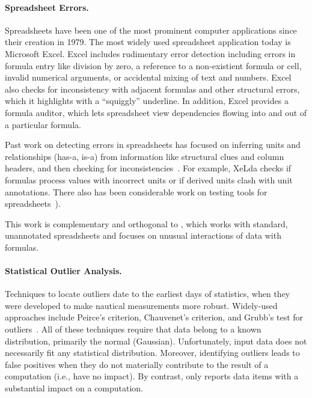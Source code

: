 \paragraph{Spreadsheet Errors.}
Spreadsheets have been one of the most prominent computer applications
since their creation in 1979.
 The most widely used spreadsheet application today is Microsoft
Excel. Excel includes rudimentary error detection including errors in
formula entry like division by zero, a reference to a non-existient
formula or cell, invalid numerical arguments, or accidental mixing of
text and numbers.
Excel also checks for inconsistency with adjacent formulas and other
structural errors, which it highlights with a ``squiggly'' underline. In addition, Excel provides a formula auditor, which lets spreadsheet view dependencies flowing into and out of a particular formula.

Past work on detecting errors in spreadsheets has focused on inferring
units and relationships (has-a, is-a) from information like structural
clues and column
headers, and then checking for inconsistencies~\cite{Antoniu:2004:VUC:998675.999448,DBLP:conf/kbse/AhmadAGK03,Chambers:2010:RSL:1860134.1860346,Erwig:2009:SES:1608570.1608694,Erwig:2005:AGM:1062455.1062494}. For
example, XeLda checks if formulas process values with incorrect units
or if derived units clash with unit annotations. There also has been
considerable work on testing tools for
spreadsheets~\cite{fisher2006scaling,rothermel1998you,rothermel2001methodology,Carver:2006:EET:1159733.1159775}).

This work is complementary and orthogonal to \checkcell{}, which
works with standard, unannotated spreadsheets and focuses on unusual
interactions of data with formulas.



\paragraph{Statistical Outlier Analysis.}

Techniques to locate outliers date to the earliest days of statistics,
when they were developed to make nautical measurements more
robust. Widely-used approaches include Peirce's criterion, Chauvenet's
criterion, and Grubb's test for
outliers~\cite{barnett1994outliers}. All of these techniques require
that data belong to a known distribution, primarily the normal
(Gaussian). Unfortunately, input data does not necessarily fit any
statistical distribution. Moreover, identifying outliers leads to
false positives when they do not materially contribute to the result
of a computation (i.e., have no impact). By contrast, \checkcell{} only reports
data items with a substantial impact on a computation.


